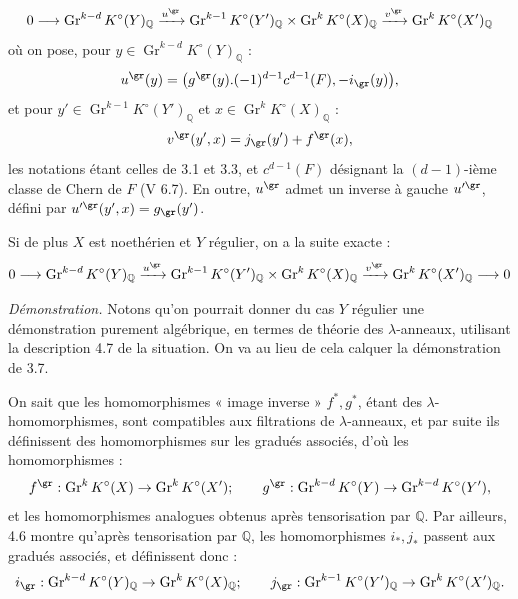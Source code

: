 \[
0\longrightarrow
\operatorname{Gr}^{k-d}K^\circ(Y)_{\mathbb Q}
\xrightarrow{u^{\gr}}
\operatorname{Gr}^{k-1}K^\circ(Y')_{\mathbb Q}
\times
\operatorname{Gr}^{k}K^\circ(X)_{\mathbb Q}
\xrightarrow{v^{\gr}}
\operatorname{Gr}^{k}K^\circ(X')_{\mathbb Q}
\]
où on pose, pour \(y\in \operatorname{Gr}^{k-d}K^\circ(Y)_{\mathbb Q}\) :
\[
  u^{\gr}(y)=
  \bigl(g^{\gr}(y).(-1)^{d-1}c^{d-1}(F),-i_{\gr}(y)\bigr),
\]
et pour \(y'\in \operatorname{Gr}^{k-1}K^\circ(Y')_{\mathbb Q}\) et \(x\in \operatorname{Gr}^{k}K^\circ(X)_{\mathbb Q}\) :
\[
  v^{\gr}(y',x)=j_{\gr}(y')+f^{\gr}(x),
\]
les notations étant celles de 3.1 et 3.3, et \(c^{d-1}(F)\) désignant la \((d-1)\)-ième classe de Chern de \(F\) (V 6.7). En outre, \(u^{\gr}\) admet un inverse à gauche \(u'^{\gr}\), défini par \(u'^{\gr}(y',x)=g_{\gr}(y')\).

Si de plus \(X\) est noethérien et \(Y\) régulier, on a la suite exacte :
\[
0\longrightarrow
\operatorname{Gr}^{k-d}K^\circ(Y)_{\mathbb Q}
\xrightarrow{u^{\gr}}
\operatorname{Gr}^{k-1}K^\circ(Y')_{\mathbb Q}
\times
\operatorname{Gr}^{k}K^\circ(X)_{\mathbb Q}
\xrightarrow{v^{\gr}}
\operatorname{Gr}^{k}K^\circ(X')_{\mathbb Q}
\longrightarrow0
\]

\emph{Démonstration.} Notons qu'on pourrait donner du cas \(Y\) régulier une démonstration purement algébrique, en termes de théorie des \(\lambda\)-anneaux, utilisant la description 4.7 de la situation. On va au lieu de cela calquer la démonstration de 3.7.

On sait que les homomorphismes « image inverse » \(f^*,g^*\), étant des \(\lambda\)-homomorphismes, sont compatibles aux filtrations de \(\lambda\)-anneaux, et par suite ils définissent des homomorphismes sur les gradués associés, d'où les homomorphismes :
\[
  f^{\gr}:\operatorname{Gr}^kK^\circ(X)\to\operatorname{Gr}^kK^\circ(X');
  \qquad
  g^{\gr}:\operatorname{Gr}^{k-d}K^\circ(Y)\to\operatorname{Gr}^{k-d}K^\circ(Y'),
\]
et les homomorphismes analogues obtenus après tensorisation par \(\mathbb Q\). Par ailleurs, 4.6 montre qu'après tensorisation par \(\mathbb Q\), les homomorphismes \(i_*,j_*\) passent aux gradués associés, et définissent
donc :
\[
  i_{\gr}:\operatorname{Gr}^{k-d}K^\circ(Y)_{\mathbb Q}
  \to \operatorname{Gr}^{k}K^\circ(X)_{\mathbb Q};
  \qquad
  j_{\gr}:\operatorname{Gr}^{k-1}K^\circ(Y')_{\mathbb Q}
  \to \operatorname{Gr}^{k}K^\circ(X')_{\mathbb Q}.
\]
